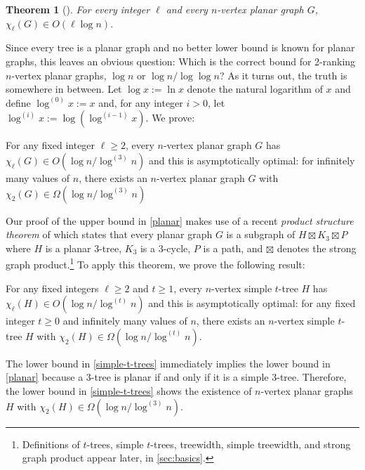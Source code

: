 \documentclass[kpfonts]{patmorin}
\newcommand{\trn}{\chi_2}
\newcommand{\lrn}{\chi_{\ell}}
\newtheorem{othertheorem}{Theorem}
\theoremstyle{named}
\begin{document}
\setcounter{othertheorem}{15}
\begin{othertheorem}[\cite{karpas.neiman.ea:on}]\label{planar-graphs}
    For every integer $\ell$ and every $n$-vertex planar graph $G$, $\lrn(G)\in O(\ell\log n)$.
\end{othertheorem}

Since every tree is a planar graph and no better lower bound is known for planar graphs, this leaves an obvious question:  Which is the correct bound for 2-ranking $n$-vertex planar graphs, $\log n$ or $\log n/\log\log n$?  As it turns out, the truth is somewhere in between.  Let $\log x :=\ln x$ denote the natural logarithm of $x$ and define $\log^{(0)}x:=x$ and, for any integer $i>0$, let $\log^{(i)}x:=\log(\log^{(i-1)} x)$. We prove:


\begin{thm}\label{planar}
    For any fixed integer $\ell\ge 2$, every $n$-vertex planar graph $G$ has $\lrn(G)\in O(\log n/\log^{(3)} n)$ and this is asymptotically optimal: for infinitely many values of $n$, there exists an $n$-vertex planar graph $G$ with $\trn(G)\in \Omega(\log n/\log^{(3)} n)$
\end{thm}

Our proof of the upper bound in \cref{planar} makes use of a recent \emph{product structure theorem} of \citet{dujmovic.joret.ea:planar} which states that every planar graph $G$ is a subgraph of $H\boxtimes K_3\boxtimes P$ where $H$ is a planar $3$-tree, $K_3$ is a 3-cycle, $P$ is a path, and $\boxtimes$ denotes the strong graph product.\footnote{Definitions of $t$-trees, simple $t$-trees, treewidth, simple treewidth, and strong graph product appear later, in \cref{sec:basics}.}  To apply this theorem, we prove the following result:

\begin{thm}\label{simple-t-trees}
    For any fixed integers $\ell\ge 2$ and $t\ge 1$, every $n$-vertex simple $t$-tree $H$ has $\lrn(H) \in O(\log n/\log^{(t)}n)$ and this is asymptotically optimal: for any fixed integer $t\ge 0$ and infinitely many values of $n$, there exists an $n$-vertex simple $t$-tree $H$ with $\trn(H)\in\Omega(\log n/\log^{(t)} n)$.
\end{thm}

The lower bound in \cref{simple-t-trees} immediately implies the lower bound in \cref{planar} because a 3-tree is planar if and only if it is a simple $3$-tree. Therefore, the lower bound in \cref{simple-t-trees} shows the existence of $n$-vertex planar graphs $H$ with $\trn(H)\in\Omega(\log n/\log^{(3)} n)$.
\end{document}
